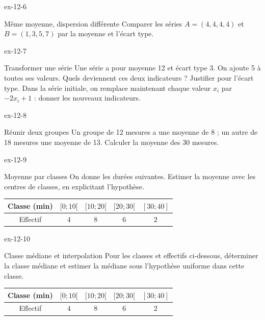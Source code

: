 \clearpage{}
\begin{blocLivre}{ex-12-6}
\begin{exercice}[2]{Même moyenne, dispersion différente}
Comparer les séries $A=(4,4,4,4)$ et $B=(1,3,5,7)$ par la moyenne et l’écart type.
\label{fig-ex-12-6}
\end{exercice}
\end{blocLivre}
\begin{blocLivre}{ex-12-7}
\begin{exercice}[2]{Transformer une série}
Une série a pour moyenne 12 et écart type 3. On ajoute 5 à toutes ses valeurs. Quels deviennent ces deux indicateurs ? Justifier pour l’écart type. Dans la série initiale, on remplace maintenant chaque valeur $x_i$ par $-2x_i+1$ : donner les nouveaux indicateurs.
\end{exercice}
\end{blocLivre}
\begin{blocLivre}{ex-12-8}
\begin{exercice}[2]{Réunir deux groupes}
Un groupe de 12 mesures a une moyenne de 8 ; un autre de 18 mesures une moyenne de 13. Calculer la moyenne des 30 mesures.
\end{exercice}
\end{blocLivre}
\begin{blocLivre}{ex-12-9}
\begin{exercice}[2]{Moyenne par classes}
On donne les durées suivantes. Estimer la moyenne avec les centres de classes, en explicitant l’hypothèse.\begin{center}\renewcommand{\arraystretch}{1.35}\begin{tabular}{c|cccc}\toprule
Classe (min) & $[0;10[$ & $[10;20[$ & $[20;30[$ & $[30;40]$\\\midrule
Effectif & $4$ & $8$ & $6$ & $2$\\
\bottomrule\end{tabular}\end{center}
\label{fig-ex-12-9}
\end{exercice}
\end{blocLivre}
\begin{blocLivre}{ex-12-10}
\begin{exercice}[2]{Classe médiane et interpolation}
Pour les classes et effectifs ci-dessous, déterminer la classe médiane et estimer la médiane sous l’hypothèse uniforme dans cette classe.\begin{center}\renewcommand{\arraystretch}{1.35}\begin{tabular}{c|cccc}\toprule
Classe (min) & $[0;10[$ & $[10;20[$ & $[20;30[$ & $[30;40]$\\\midrule
Effectif & $4$ & $8$ & $6$ & $2$\\
\bottomrule\end{tabular}\end{center}
\label{fig-ex-12-10}
\end{exercice}
\end{blocLivre}

